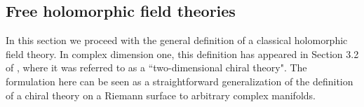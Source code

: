 \documentclass[10pt]{amsart}
\begin{document}
%
%
%
%

\subsection{Free holomorphic field theories}

In this section we proceed with the general definition of a classical holomorphic field theory. 
In complex dimension one, this definition has appeared in Section 3.2 of \cite{LiVertex}, where it was referred to as a ``two-dimensional chiral theory". 
The formulation here can be seen as a straightforward generalization of the definition of a chiral theory on a Riemann surface to arbitrary complex manifolds. 
\end{document}
